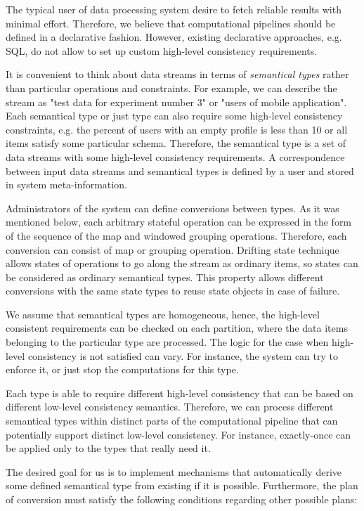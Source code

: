 \label{fs-phd-reliable}

The typical user of data processing system desire to fetch reliable results with minimal effort. Therefore, we believe that computational pipelines should be defined in a declarative fashion. However, existing declarative approaches, e.g. SQL, do not allow to set up custom high-level consistency requirements. 

It is convenient to think about data streams in terms of {\em semantical types} rather than particular operations and constraints. For example, we can describe the stream as "test data for experiment number 3" or "users of mobile application". Each semantical type or just type can also require some high-level consistency constraints, e.g. the percent of users with an empty profile is less than 10 or all items satisfy some particular schema. Therefore, the semantical type is a set of data streams with some high-level consistency requirements. A correspondence between input data streams and semantical types is defined by a user and stored in system meta-information.

Administrators of the system can define conversions between types. As it was mentioned below, each arbitrary stateful operation can be expressed in the form of the sequence of the map and windowed grouping operations. Therefore, each conversion can consist of map or grouping operation. Drifting state technique allows states of operations to go along the stream as ordinary items, so states can be considered as ordinary semantical types. This property allows different conversions with the same state types to reuse state objects in case of failure.

We assume that semantical types are homogeneous, hence, the high-level consistent requirements can be checked on each partition, where the data items belonging to the particular type are processed. The logic for the case when high-level consistency is not satisfied can vary. For instance, the system can try to enforce it, or just stop the computations for this type.

Each type is able to require different high-level consistency that can be based on different low-level consistency semantics. Therefore, we can process different semantical types within distinct parts of the computational pipeline that can potentially support distinct low-level consistency. For instance, exactly-once can be applied only to the types that really need it.  

The desired goal for us is to implement mechanisms that automatically derive some defined semantical type from existing if it is possible. Furthermore, the plan of conversion must satisfy the following conditions regarding other possible plans:

